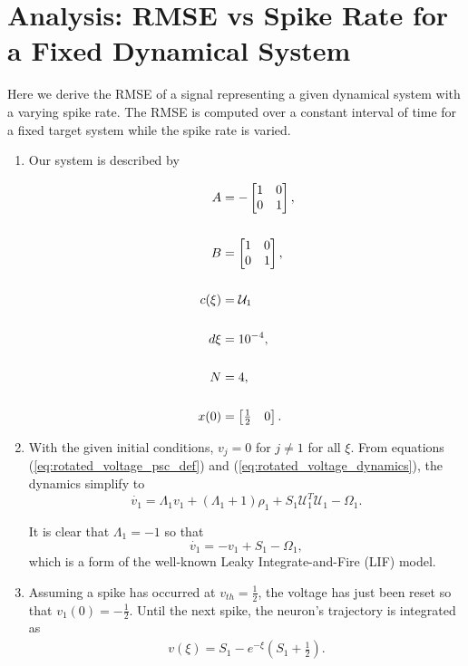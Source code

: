 
\section{Analysis: RMSE vs Spike Rate for a Fixed Dynamical System}


 Here we derive the RMSE of a signal representing a given dynamical system with a varying spike rate. The RMSE is computed over a constant interval of time for a fixed target system while the spike rate is varied.  
\begin{enumerate}
\item Our system is described by 

\begin{align*}
A &= -\begin{bmatrix}  
1 & 0 \\
0 & 1
\end{bmatrix},\notag \\
\notag \\
B &= \begin{bmatrix}  
1 & 0 \\
0 & 1
\end{bmatrix}, \notag \\
\notag \\
c(\xi) &= \mathcal{U}_1 \\
\notag \\
d\xi &= 10^{-4},\notag \\
\notag \\
N &= 4,\notag \\
\notag \\
x(0) &= \begin{bmatrix} \frac{1}{2} & 0 \end{bmatrix}.\notag 
\end{align*}

\item With the given initial conditions, $v_j = 0$ for $j \neq 1$ for all $\xi$. From equations (\ref{eq:rotated_voltage_psc_def}) and (\ref{eq:rotated_voltage_dynamics}), the dynamics simplify to 
\begin{equation*}
\dot{v_1} = \Lambda_1 v_1 + (\Lambda_1 + 1)\rho_1 + S_1 \mathcal{U}_1^T \mathcal{U}_1 - \Omega_1.
\end{equation*}

It is clear that $\Lambda_1 = -1$ so that 
\begin{equation}
\label{eq:analysis_voltage_dynamics_constant_driving_const_dynamics}
\dot{v_1} = -v_1 + S_1 - \Omega_1,
\end{equation}
which is a form of the well-known Leaky Integrate-and-Fire (LIF) model.
\item  Assuming a spike has occurred at $v_{th} = \frac{1}{2}$, the voltage has just been reset so that $v_1(0) = -\frac{1}{2}$. Until the next spike, the neuron's trajectory is integrated as 
\begin{align*}
v(\xi) =  S_1 - e^{-\xi} (S_1 + \frac{1}{2}).
\end{align*}


\end{enumerate}
